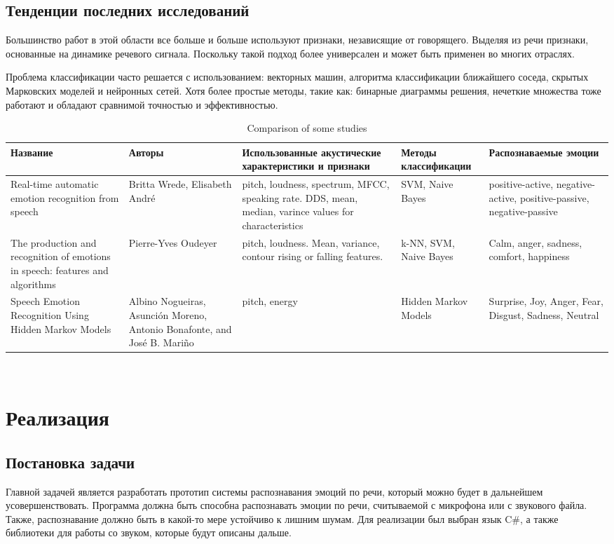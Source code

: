 \documentclass[14pt]{extarticle}
\begin{document}
\subsection{Тенденции последних исследований}
Большинство работ в этой области все больше и больше используют признаки, независящие от говорящего. Выделяя из речи признаки, основанные на динамике речевого сигнала. Поскольку такой подход более универсален и может быть применен во многих отраслях.

Проблема классификации часто решается с использованием: векторных машин, алгоритма классификации ближайшего соседа, скрытых Марковских моделей и нейронных сетей. Хотя более простые методы, такие как: бинарные диаграммы решения, нечеткие множества тоже работают и обладают сравнимой точностью и эффективностью.

\begin{table}[h]
	\small
	\begin{tabular}{|p{3cm}|p{3cm}|p{3cm}|p{3cm}|p{3cm}|}
		Название & Авторы & Использованные акустические характеристики и признаки & Методы классификации & Распознаваемые эмоции \\ \hline
		Real-time automatic emotion recognition
		from speech & Britta Wrede, Elisabeth André & pitch, loudness, spectrum, MFCC, speaking rate. DDS, mean, median, varince values for characteristics & SVM, Naive Bayes & positive-active, negative-active, positive-passive, negative-passive\\ \hline
		The production and recognition of emotions in
		speech: features and algorithms & Pierre-Yves Oudeyer & pitch, loudness. Mean, variance, contour rising or falling features. & k-NN, SVM, Naive Bayes& Calm, anger, sadness, comfort, happiness\\ \hline
		Speech Emotion Recognition Using Hidden Markov Models & Albino Nogueiras, Asunción Moreno, Antonio Bonafonte, and José B. Mariño & pitch, energy & Hidden Markov Models & Surprise, Joy, Anger, Fear, Disgust, Sadness, Neutral \\\hline
	\end{tabular}
	\caption{Comparison of some studies}
	\
\end{table}
\section{Реализация}
\subsection{Постановка задачи}
Главной задачей является разработать прототип системы распознавания эмоций по речи, который можно будет в дальнейшем усовершенствовать. Программа должна быть способна распознавать эмоции по речи, считываемой с микрофона или с звукового файла. Также, распознавание должно быть в какой-то мере устойчиво к лишним шумам. Для реализации был выбран язык C\#, а также библиотеки для работы со звуком, которые будут описаны дальше.
\end{document}
